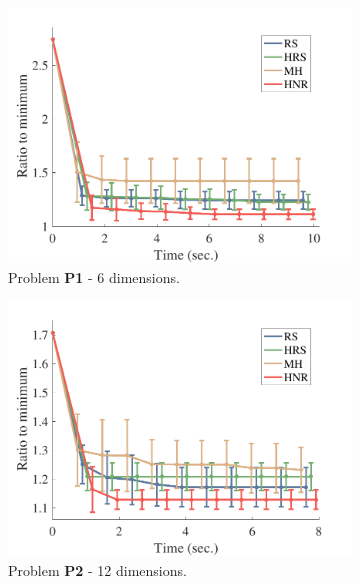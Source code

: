 \documentclass[letterpaper, 10 pt, conference]{ieeeconf}  %
\begin{document}
\begin{figure}[t!]
	\centering
	\begin{subfigure}[b]{0.325\textwidth}
		\includegraphics[width=\linewidth]{fig/planning_efficiency/3dof_general}
		\caption{\captionstyle Problem \textbf{P1} - 6 dimensions.}
		\label{fig:planning_efficiency:3dof:general}
	\end{subfigure}	
	\begin{subfigure}[b]{0.325\textwidth}
		\includegraphics[width=\linewidth]{fig/planning_efficiency/6dof_hammering}
		\caption{\captionstyle Problem \textbf{P2} - 12 dimensions.}
		\label{fig:planning_efficiency:6dof:hammering}
	\end{subfigure}
	\begin{subfigure}[b]{0.325\textwidth}

\end{subfigure}
\end{figure}
\end{document}
